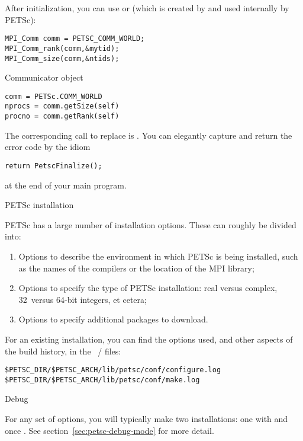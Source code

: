 After initialization, you can use  or
(which is created by  and used internally by PETSc):

\begin{lstlisting}
MPI_Comm comm = PETSC_COMM_WORLD;
MPI_Comm_rank(comm,&mytid);
MPI_Comm_size(comm,&ntids);
\end{lstlisting}

\begin{pythonnote}{Communicator object}
\begin{verbatim}
comm = PETSc.COMM_WORLD
nprocs = comm.getSize(self) 
procno = comm.getRank(self)
\end{verbatim}
\end{pythonnote}

The corresponding call to replace  is
.
You can elegantly capture and return the error code by the idiom
\begin{lstlisting}
return PetscFinalize();
\end{lstlisting}
at the end of your main program.

 {PETSc installation}
\label{sec:petsc-install}

PETSc has a large number of installation options. These can roughly be
divided into:
\begin{enumerate}
\item Options to describe the environment in which PETSc is being
  installed, such as the names of the compilers or the location of the
  MPI library;
\item Options to specify the type of PETSc installation: real versus
  complex, 32~versus 64-bit integers, et cetera;
\item Options to specify additional packages to download.
\end{enumerate}

For an existing installation, you can find the options used,
and other aspects of the build history,
in the ~/ 
files:
\begin{verbatim}
$PETSC_DIR/$PETSC_ARCH/lib/petsc/conf/configure.log
$PETSC_DIR/$PETSC_ARCH/lib/petsc/conf/make.log
\end{verbatim}

 {Debug}

For any set of options, you will typically make two installations:
one with  and once .
See section~\ref{sec:petsc-debug-mode} for more detail.

